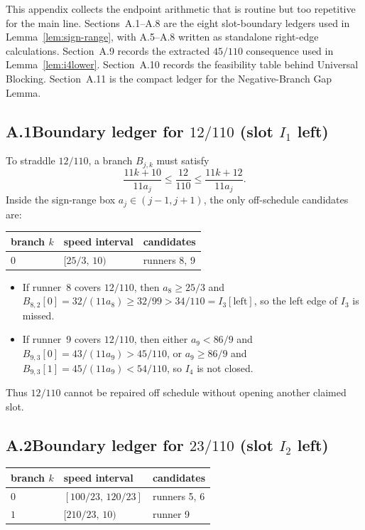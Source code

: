 \documentclass[12pt,a4paper]{amsart}
\theoremstyle{definition}
\theoremstyle{remark}
\begin{document}
This appendix collects the endpoint arithmetic that is routine but too repetitive for the
main line. Sections~A.1--A.8 are the eight slot-boundary ledgers used in
Lemma~\ref{lem:sign-range}, with A.5--A.8 written as standalone right-edge calculations.
Section~A.9 records the extracted $45/110$ consequence used in Lemma~\ref{lem:i4lower}.
Section~A.10 records the feasibility table behind Universal Blocking.
Section~A.11 is the compact ledger for the Negative-Branch Gap Lemma.

\subsection*{A.1\quad Boundary ledger for $12/110$ (slot $I_1$ left)}

To straddle $12/110$, a branch $B_{j,k}$ must satisfy
\[
  \frac{11k+10}{11a_j} \le \frac{12}{110} \le \frac{11k+12}{11a_j}.
\]
Inside the sign-range box $a_j\in(j-1,j+1)$, the only off-schedule candidates are:

\begin{center}
\begin{tabular}{lll}
\toprule
branch $k$ & speed interval & candidates \\
\midrule
$0$ & $[25/3,\,10)$ & runners 8, 9 \\
\bottomrule
\end{tabular}
\end{center}

\begin{itemize}
  \item If runner~8 covers $12/110$, then $a_8\ge 25/3$ and
        $B_{8,2}[0]=32/(11a_8)\ge 32/99>34/110=I_3[\mathrm{left}]$,
        so the left edge of $I_3$ is missed.
  \item If runner~9 covers $12/110$, then either $a_9<86/9$ and
        $B_{9,3}[0]=43/(11a_9)>45/110$, or $a_9\ge 86/9$ and
        $B_{9,3}[1]=45/(11a_9)<54/110$, so $I_4$ is not closed.
\end{itemize}

Thus $12/110$ cannot be repaired off schedule without opening another claimed slot.

\subsection*{A.2\quad Boundary ledger for $23/110$ (slot $I_2$ left)}

\begin{center}
\begin{tabular}{lll}
\toprule
branch $k$ & speed interval & candidates \\
\midrule
$0$ & $[100/23,\,120/23]$ & runners 5, 6 \\
$1$ & $[210/23,\,10)$ & runner 9 \\
\bottomrule
\end{tabular}
\end{center}
\end{document}
